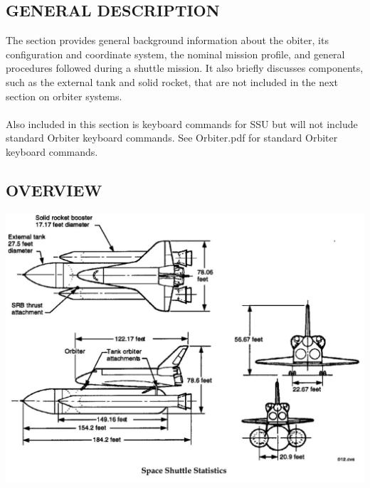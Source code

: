 \documentclass[13pt]{article}
\begin{document}
\begin{multicols}{2}
\section{\large GENERAL DESCRIPTION}
\localtableofcontents
\noindent
The section provides general background information about the obiter, its configuration and coordinate system, the nominal mission profile, and general procedures followed during a shuttle mission. It also briefly discusses components, such as the external tank and solid rocket, that are not included in the next section on orbiter systems.\\
\\
Also included in this section is keyboard commands for SSU but will not include standard Orbiter keyboard commands. See Orbiter.pdf for standard Orbiter keyboard commands.
\newpage

\subsection{\large OVERVIEW}
\localtableofcontents

\end{multicols}
\includegraphics[width=1\textwidth]{Space Shuttle Stats.jpg}
\end{document}
